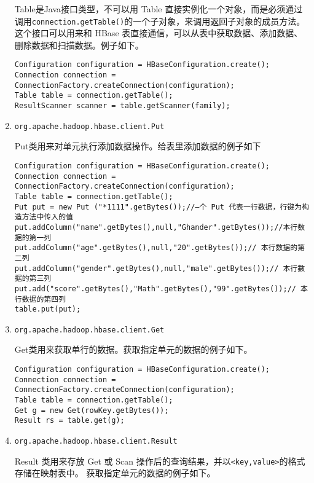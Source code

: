 \begin{enumerate}[1)]
Table是Java接口类型，不可以用 Table 直接实例化一个对象，而是必须通过调用\lstinline{connection.getTable()}的一个子对象，来调用返回子对象的成员方法。这个接口可以用来和 HBase 表直接通信，可以从表中获取数据、添加数据、删除数据和扫描数据。例子如下。

\begin{lstlisting}[style=customjava]
Configuration configuration = HBaseConfiguration.create();
Connection connection = ConnectionFactory.createConnection(configuration);
Table table = connection.getTable();
ResultScanner scanner = table.getScanner(family);
\end{lstlisting}


\item \lstinline{org.apache.hadoop.hbase.client.Put}

Put类用来对单元执行添加数据操作。给表里添加数据的例子如下

\begin{lstlisting}[style=customjava]
Configuration configuration = HBaseConfiguration.create();
Connection connection = ConnectionFactory.createConnection(configuration);
Table table = connection.getTable();
Put put = new Put ("*1111".getBytes());//—个 Put 代表一行数据，行键为构造方法中传入的值
put.addColumn("name".getBytes(),null,"Ghander".getBytes());//本行数据的第一列
put.addColumn("age".getBytes(),null,"20".getBytes());// 本行数据的第二列
put.addColumn("gender".getBytes(),null,"male".getBytes());// 本行數据的第三列
put.add("score".getBytes(),"Math".getBytes(),"99".getBytes());// 本行数据的第四列
table.put(put);
\end{lstlisting}


\item \lstinline{org.apache.hadoop.hbase.client.Get}

Get类用来获取单行的数据。获取指定单元的数据的例子如下。

\begin{lstlisting}[style=customjava]
Configuration configuration = HBaseConfiguration.create();
Connection connection = ConnectionFactory.createConnection(configuration);
Table table = connection.getTable();
Get g = new Get(rowKey.getBytes());
Result rs = table.get(g);
\end{lstlisting}


\item \lstinline{org.apache.hadoop.hbase.client.Result}

Result 类用来存放 Get 或 Scan 操作后的查询结果，并以\lstinline{<key,value>}的格式存储在映射表中。
获取指定单元的数据的例子如下。


\end{enumerate}
